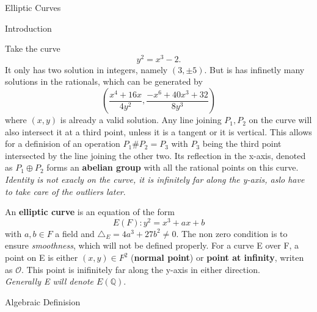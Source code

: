 \documentclass[12pt, letterpaper]{article}
\begin{document}
\begin{section}{Elliptic Curves}

  \begin{subsection}{Introduction}

    Take the curve \[y^{2} = x^{3} - 2.\] It only has two solution in integers,
    namely \((3, \pm 5)\). But is has infinetly many solutions in the
    rationals, which can be generated by
    \[\left( \frac{x^{4} + 16x}{4y^{2}}, \frac{-x^{6} + 40x^{3} + 32}{8y^{3}}
      \right)\]
    where \((x, y)\) is already a valid solution. Any line joining \(P_{1},
    P_{2}\) on the curve will also intersect it at a third point, unless it
    is a tangent or it is vertical. This allows for a definision of an
    operation \(P_{1} \# P_{2} = P_{3}\) with \(P_{3}\) being the third point
    intersected by the line joining the other two. Its reflection in the
    x-axis, denoted as \(P_{1} \oplus P_{2}\) forms an \textbf{abelian group}
    with all the rational points on this curve. \textit{Identity is not exacly
      on the curve, it is infinitely far along the y-axis, aslo have to take
      care of the outliers later}.

    An \textbf{elliptic curve} is an equation of the form
    \[E(F): y^{2} = x^{3} + ax + b\] with \(a, b \in F\) a field and
    \(\triangle_{E} = 4a^{3} + 27b^{2} \neq 0\). The non zero condition is to
    ensure \textit{smoothness}, which will not be defined properly. For a
    curve E over F, a point on E is either \((x, y) \in F^{2}\)
    (\textbf{normal point}) or \textbf{point at infinity}, writen as
    \(\mathcal{O}\). This point is inifinitely far along the y-axis in either
    direction. \\
    \textit{Generally E will denote \(E(\mathbb{Q})\)}.

  \end{subsection}

  \begin{subsection}{Algebraic Definision}


\end{subsection}
\end{section}
\end{document}
